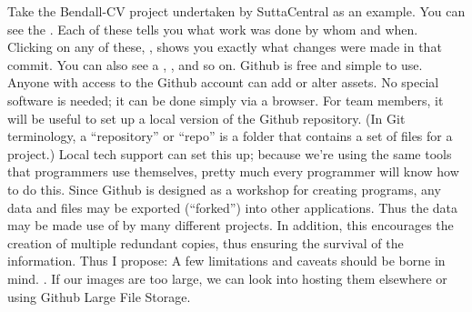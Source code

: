 {}Take the Bendall-CV project undertaken by SuttaCentral as an example. You can see the . Each of these tells you what work was done by whom and when. Clicking on any of these, , shows you exactly what changes were made in that commit. You can also see a , , and so on.\markdownRendererInterblockSeparator
{}Github is free and simple to use. Anyone with access to the Github account can add or alter assets. No special software is needed; it can be done simply via a browser. For team members, it will be useful to set up a local version of the Github repository. (In Git terminology, a “repository” or “repo” is a folder that contains a set of files for a project.) Local tech support can set this up; because we’re using the same tools that programmers use themselves, pretty much every programmer will know how to do this.\markdownRendererInterblockSeparator
{}Since Github is designed as a workshop for creating programs, any data and files may be exported (“forked”) into other applications. Thus the data may be made use of by many different projects. In addition, this encourages the creation of multiple redundant copies, thus ensuring the survival of the information.\markdownRendererInterblockSeparator
{}Thus I propose:\markdownRendererInterblockSeparator
{}\markdownRendererBlockQuoteBegin
{}
\markdownRendererBlockQuoteEnd \markdownRendererInterblockSeparator
{}\markdownRendererInterblockSeparator
{}A few limitations and caveats should be borne in mind.\markdownRendererInterblockSeparator
{}\markdownRendererUlBeginTight
\markdownRendererUlItem {}. If our images are too large, we can look into hosting them elsewhere or using Github Large File Storage.\markdownRendererUlItemEnd 
